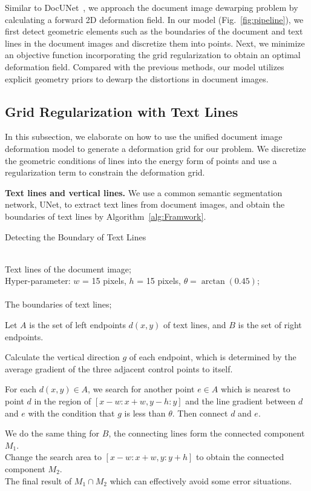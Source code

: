 \documentclass[10pt,twocolumn,letterpaper]{article}
\newcommand{\myparagraph}[1]{\vspace{1pt} \noindent \textbf{#1} }
\begin{document}
Similar to DocUNet~\cite{Ma_2018_CVPR}, we approach the document image dewarping problem by calculating a forward 2D deformation field. In our model (Fig.~\ref{fig:pipeline}), we first detect geometric elements such as the boundaries of the document and text lines in the document images and discretize them into points. Next, we minimize an objective function incorporating the grid regularization to obtain an optimal deformation field. Compared with the previous methods, our model utilizes explicit geometry priors to dewarp the distortions in document images. 

\subsection{Grid Regularization with Text Lines}

In this subsection, we elaborate on how to use the unified document image deformation model to generate a deformation grid for our problem.  We discretize the geometric conditions of lines into the energy form of points and use a regularization term to constrain the deformation grid.  


\myparagraph{Text lines and vertical lines.} We use a common semantic segmentation network, \ie UNet, to extract text lines from document images, and obtain the boundaries of text lines by Algorithm~\ref{alg:Framwork}.
\vspace{-1em}
\begin{algorithm}[!htb] 
\renewcommand{\algorithmicrequire}{\textbf{Input:}}
\renewcommand{\algorithmicensure}{\textbf{Output:}}
\caption{Detecting the Boundary of Text Lines} 
\label{alg:Framwork} 
\begin{algorithmic}[1] \REQUIRE ~~\\ Text lines of the document image;\\
Hyper-parameter: $w$ = 15 pixels, $h$ = 15 pixels, $\theta = \arctan (0.45)$;\\
\ENSURE ~~\\ The boundaries of text lines;


\STATE Let $A$ is the set of left endpoints $d(x,y)$ of text lines,  and $B$ is the set of right endpoints.  

\STATE Calculate the vertical direction $g$ of each endpoint, which is determined by the average gradient of the three adjacent control points to itself. 

\STATE For each $d(x,y)$$\in$$A$, we search for another point $e \in A$ which is nearest to point $d$ in the region of $\left[x-w:x+w,y-h:y\right]$ and the line gradient between $d$ and $e$ with the condition that $g$ is less than $\theta$. Then connect $d$ and $e$. 

\STATE We do the same thing for $B$, the connecting lines form the connected component $M_1$. \\

\STATE Change the search area to $\left[x-w:x+w,y:y+h\right]$ to obtain the connected component $M_2$. \\ 
\STATE The final result of $M_{1}\cap M_{2}$ which can effectively avoid some error situations.  
\end{algorithmic}
\end{algorithm}
\end{document}
